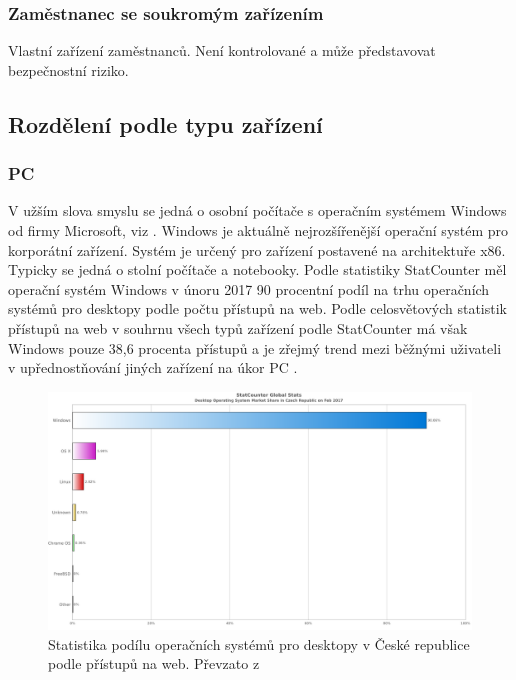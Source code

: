  \subsubsection{Zaměstnanec se soukromým zařízením}
 Vlastní zařízení zaměstnanců. Není kontrolované a může představovat bezpečnostní riziko.
 
 \subsection{Rozdělení podle typu zařízení}
 \subsubsection{PC}%
 V užším slova smyslu se jedná o osobní počítače s operačním systémem Windows od firmy Microsoft, viz \cite{Intel_Mac_PC}. Windows je aktuálně nejrozšířenější operační systém pro korporátní zařízení. Systém je určený pro zařízení postavené na architektuře x86. Typicky se jedná o stolní počítače a notebooky. Podle statistiky StatCounter%
 \cite{Statcounter1} měl operační systém Windows v únoru 2017 90 procentní podíl na trhu operačních systémů pro desktopy podle počtu přístupů na web. Podle celosvětových statistik přístupů na web v souhrnu všech typů zařízení podle StatCounter má však Windows pouze 38,6 procenta přístupů a je zřejmý trend mezi běžnými uživateli v upřednostňování jiných zařízení na úkor PC \cite{HNAndroid}.%
 
\begin{figure}[h]
\includegraphics[width=13cm]{img/StatCounter_Desktop}
\caption{Statistika podílu operačních systémů pro desktopy v České republice podle přístupů na web. Převzato z \cite{Statcounter1}} 
\centering
\end{figure}%
 
